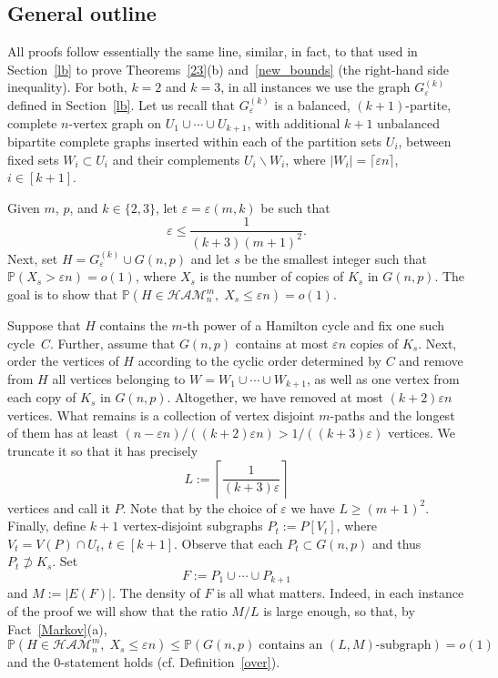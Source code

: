 \documentclass[reqno, 12pt]{amsart}
\numberwithin{equation}{section}
\numberwithin{figure}{section}
\let\setminus=\smallsetminus
\let\epsilon=\varepsilon
\let\eps=\epsilon
\def\PP{{\mathds P}}
\let\Prob=\PP
\newcommand{\ham}{\mathcal{HAM}}
\theoremstyle{plain}
\theoremstyle{definition}
\begin{document}

\subsection{General outline}


	
All proofs follow essentially the same line,  similar, in fact, to that used in Section~\ref{lb} to prove Theorems~\ref{23}(b) and~\ref{new_bounds} (the right-hand side inequality). For both, $k=2$ and $k=3$, in all instances we use  the graph
 $G^{(k)}_\eps$ defined in Section~\ref{lb}. Let us recall that
$G^{(k)}_\eps$ is a balanced, $(k+1)$-partite, complete $n$-vertex graph on $U_1\cup\cdots\cup U_{k+1}$, with additional $k+1$ unbalanced bipartite complete graphs inserted within each of the partition sets $U_i$, between fixed sets $W_i\subset U_i$ and their complements $U_i\!\setminus\! W_i$, where $|W_i|=\lceil\eps n\rceil$, $i\in[k+1]$.  %


Given $m$, $p$, and $k\in\{2,3\}$, let $\eps=\eps(m,k)$ be such that
\begin{equation*}%
    \eps\le \frac1{(k+3) (m+1)^2}.
\end{equation*}
Next, set $H=G^{(k)}_\eps\cup G(n,p)$ and let $s$ be the smallest integer such that $\Prob(X_s>\eps n)=o(1)$, where $X_s$ is the number of copies of $K_s$ in $G(n,p)$. The goal is to show that \newline $\Prob(H\in\ham^m_n,\;X_s\le\eps n)=o(1)$.

Suppose that $H$ contains  the $m$-th power of a Hamilton cycle and fix one such cycle~$C$. Further, assume that $G(n,p)$ contains at most $\eps n$ copies of $K_s$.
Next, order the vertices of $H$ according to the cyclic order determined by $C$ and remove from $H$ all vertices belonging to $W=W_1\cup \cdots\cup W_{k+1}$, as well as one vertex from each copy of $K_s$ in $G(n,p)$. Altogether, we have removed at most $(k+2)\eps n$ vertices. What remains is a collection of vertex disjoint $m$-paths and the longest of them has at least $(n-\eps n)/((k+2)\eps n)>1/((k+3)\eps)$ vertices. We truncate it so that it has precisely
\[L:=\left\lceil \frac1{(k+3)\eps}\right\rceil\]
vertices and call it $P$. Note that by the choice of $\eps$ we have $L\ge(m+1)^2$. Finally, define $k+1$ vertex-disjoint subgraphs $P_t:=P[V_t]$, where $V_t= V(P)\cap U_t$, $t\in[k+1]$. Observe that each $P_t\subset G(n,p)$ and thus $P_t\not\supset K_s$.
Set
\[F:=P_1\cup \cdots\cup P_{k+1}\]
and $M := |E(F)|$. The density of $F$ is all what matters.
Indeed, in each instance of the proof we will show that the ratio $M/L$ is large enough, so that,  by Fact~\ref{Markov}(a),
$$\Prob(H\in\ham^m_n,\;X_s\le\eps n)\le\Prob(G(n,p)\;\mbox{contains an $(L,M)$-subgraph})=o(1)$$
and the 0-statement holds (cf. Definition~\ref{over}).
\end{document}

